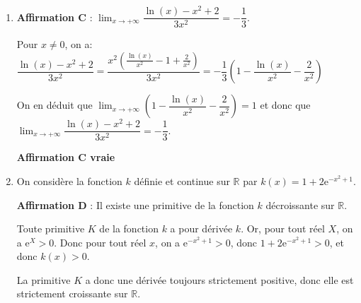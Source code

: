 \documentclass[10pt]{article}
\providecommand{\blue}{\color{blue}}
\providecommand{\R}{\mathbb{R}}
\providecommand{\e}{{\mathrm{e}}}
\providecommand{\blue}{\color{blue}}
\providecommand{\ds}{\displaystyle}
\begin{document}
\begin{enumerate}
La fonction $f$ est dérivable donc continue sur $\R$. Elle est strictement croissante sur $\R$ et va de $-\infty$ à $+\infty$. Donc, d'après le corollaire du théorème des valeurs intermédiaires, l'équation $f(x)=-2$ admet une solution unique dans $\R$.

\begin{flushright}
\textbf{\blue Affirmation B fausse}
\end{flushright}

\item \textbf{Affirmation C} :
$\displaystyle\lim_{x \to + \infty} \dfrac{\ln(x) - x^2 +2}{3x^2} = - \dfrac13$.

Pour $x\neq 0$, on a:
$\dfrac{\ln(x) - x^2 +2}{3x^2}
= \dfrac{x^2 \left (\frac{\ln(x)}{x^2} -1 +\frac{2}{x^2} \right )}{3x^2}
= -\dfrac{1}{3} \left ( 1 -  \dfrac{\ln(x)}{x^2} -\dfrac{2}{x^2}  \right )$ 


On en déduit que
$\ds\lim_{x\to +\infty} \left ( 1 -  \dfrac{\ln(x)}{x^2} -\dfrac{2}{x^2}  \right )=1$ et donc que $\displaystyle\lim_{x \to + \infty} \dfrac{\ln(x) - x^2 +2}{3x^2} = - \dfrac13$.

\begin{flushright}
\textbf{\blue Affirmation C vraie}
\end{flushright}

\item On considère la fonction $k$ définie et continue sur $\R$ par
$k(x) = 1 + 2\e^{-x^2 + 1}$.

\textbf{Affirmation D} : Il existe une primitive de la fonction $k$ décroissante sur $\R$.

Toute primitive $K$ de la fonction $k$ a pour dérivée $k$. Or, pour tout réel $X$, on a $\e^{X}>0$. Donc pour tout réel $x$, on a $\e^{-x^2 + 1}>0$, donc $1+2\e^{-x^2 + 1}>0$, et donc $k(x)>0$.

La primitive $K$ a donc une dérivée toujours strictement positive, donc elle est strictement croissante sur $\R$.


\end{enumerate}
\end{document}
